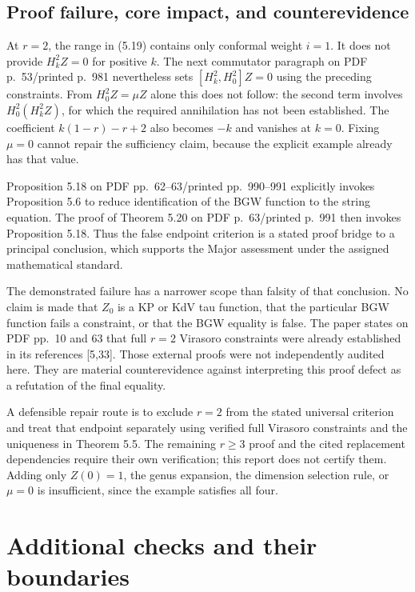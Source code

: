 \documentclass[10pt]{article}
\begin{document}
\subsection*{Proof failure, core impact, and counterevidence}
At \(r=2\), the range in (5.19) contains only conformal weight \(i=1\). It does not provide \(H_k^2Z=0\) for positive \(k\). The next commutator paragraph on PDF p. 53/printed p. 981 nevertheless sets \([H_k^2,H_0^2]Z=0\) using the preceding constraints. From \(H_0^2Z=\mu Z\) alone this does not follow: the second term involves \(H_0^2(H_k^2Z)\), for which the required annihilation has not been established. The coefficient \(k(1-r)-r+2\) also becomes \(-k\) and vanishes at \(k=0\). Fixing \(\mu=0\) cannot repair the sufficiency claim, because the explicit example already has that value.\par
Proposition 5.18 on PDF pp. 62–63/printed pp. 990–991 explicitly invokes Proposition 5.6 to reduce identification of the BGW function to the string equation. The proof of Theorem 5.20 on PDF p. 63/printed p. 991 then invokes Proposition 5.18. Thus the false endpoint criterion is a stated proof bridge to a principal conclusion, which supports the Major assessment under the assigned mathematical standard.\par
The demonstrated failure has a narrower scope than falsity of that conclusion. No claim is made that \(Z_0\) is a KP or KdV tau function, that the particular BGW function fails a constraint, or that the BGW equality is false. The paper states on PDF pp. 10 and 63 that full \(r=2\) Virasoro constraints were already established in its references [5,33]. Those external proofs were not independently audited here. They are material counterevidence against interpreting this proof defect as a refutation of the final equality.\par
A defensible repair route is to exclude \(r=2\) from the stated universal criterion and treat that endpoint separately using verified full Virasoro constraints and the uniqueness in Theorem 5.5. The remaining \(r\ge3\) proof and the cited replacement dependencies require their own verification; this report does not certify them. Adding only \(Z(0)=1\), the genus expansion, the dimension selection rule, or \(\mu=0\) is insufficient, since the example satisfies all four.\par
\section*{Additional checks and their boundaries}
\end{document}
